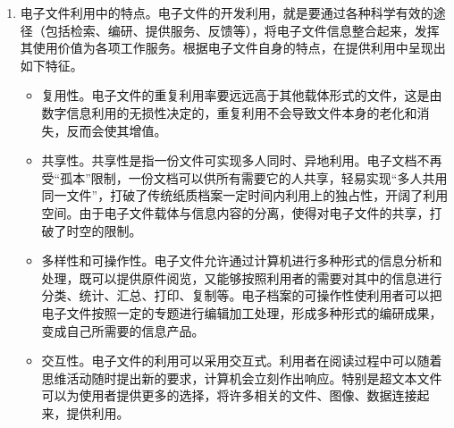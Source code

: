     \begin{enumerate}
    \item 电子文件利用中的特点。电子文件的开发利用，就是要通过各种科学有效的途径（包括检索、编研、提供服务、反馈等），将电子文件信息整合起来，发挥其使用价值为各项工作服务。根据电子文件自身的特点，在提供利用中呈现出如下特征。
        \begin{itemize}
            \item  复用性。电子文件的重复利用率要远远高于其他载体形式的文件，这是由数字信息利用的无损性决定的，重复利用不会导致文件本身的老化和消失，反而会使其增值。
            \item  共享性。共享性是指一份文件可实现多人同时、异地利用。电子文档不再受“孤本”限制，一份文档可以供所有需要它的人共享，轻易实现“多人共用同一文件”，打破了传统纸质档案一定时间内利用上的独占性，开阔了利用空间。由于电子文件载体与信息内容的分离，使得对电子文件的共享，打破了时空的限制。
            \item  多样性和可操作性。电子文件允许通过计算机进行多种形式的信息分析和处理，既可以提供原件阅览，又能够按照利用者的需要对其中的信息进行分类、统计、汇总、打印、复制等。电子档案的可操作性使利用者可以把电子文件按照一定的专题进行编辑加工处理，形成多种形式的编研成果，变成自己所需要的信息产品。
            \item  交互性。电子文件的利用可以采用交互式。利用者在阅读过程中可以随着思维活动随时提出新的要求，计算机会立刻作出响应。特别是超文本文件可以为使用者提供更多的选择，将许多相关的文件、图像、数据连接起来，提供利用。
        \end{itemize}


\end{enumerate}
